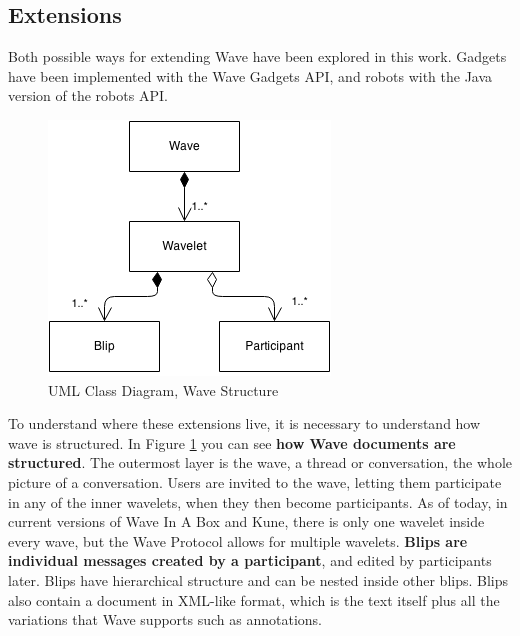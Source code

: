 \subsection{Extensions}
Both possible ways for extending Wave have been explored in this work. Gadgets have been implemented with the Wave Gadgets API, and robots with the Java version of the robots API.
\begin{figure}[h]
  \center
    \includegraphics[keepaspectratio, scale=0.7]{Media/Diagrams/Wave/Structure.png}
  \caption{UML Class Diagram, Wave Structure}
  \label{fig:wave_structure}
\end{figure}
To understand where these extensions live, it is necessary to understand how wave is structured. In Figure \ref{fig:wave_structure} you can see \textbf{how Wave documents are structured}. The outermost layer is the wave, a thread or conversation, the whole picture of a conversation. Users are invited to the wave, letting them participate in any of the inner wavelets, when they then become participants. As of today, in current versions of Wave In A Box and Kune, there is only one wavelet inside every wave, but the Wave Protocol allows for multiple wavelets. \textbf{Blips are individual messages created by a participant}, and edited by participants later. Blips have hierarchical structure and can be nested inside other blips. Blips also contain a document in XML-like format, which is the text itself plus all the variations that Wave supports such as annotations.

